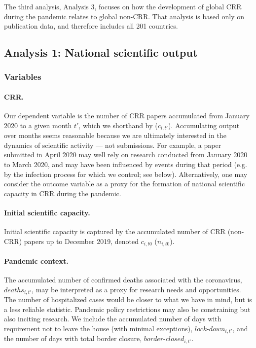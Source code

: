 The third analysis, Analysis 3, focuses on how the development of global CRR during the pandemic relates to global non-CRR. That analysis is based only on publication data, and therefore includes all 201 countries.


\subsection{Analysis 1: National scientific output}
\label{subsec:Analysis1}

\subsubsection{Variables}

\paragraph{CRR.} Our dependent variable is the number of CRR papers accumulated from January 2020 to a given month $t'$, which we shorthand by ($c_{i,t'}$). Accumulating output over months seems reasonable because we are ultimately interested in the dynamics of scientific activity --- not submissions. For example, a paper submitted in April 2020 may well rely on research conducted from January 2020 to March 2020, and may have been influenced by events during that period (e.g. by the infection process for which we control; see below). Alternatively, one may consider the outcome variable as a proxy for the formation of national scientific capacity in CRR during the pandemic.

\paragraph{Initial scientific capacity.} Initial scientific capacity is captured by the accumulated number of CRR (non-CRR) papers up to December 2019, denoted $c_{i,t0}$ ($n_{i,t0}$). 

\paragraph{Pandemic context.} The accumulated number of confirmed deaths associated with the coronavirus, $deaths_{i,t'}$, may be interpreted as a proxy for research needs and opportunities. The number of hospitalized cases would be closer to what we have in mind, but is a less reliable statistic. Pandemic policy restrictions may also be constraining but also inciting research. We include the accumulated number of days with requirement not to leave the house (with minimal exceptions), $lock\text{-}down_{i,t'}$, and the number of days with total border closure, $border\text{-}closed_{i,t'}$. 

